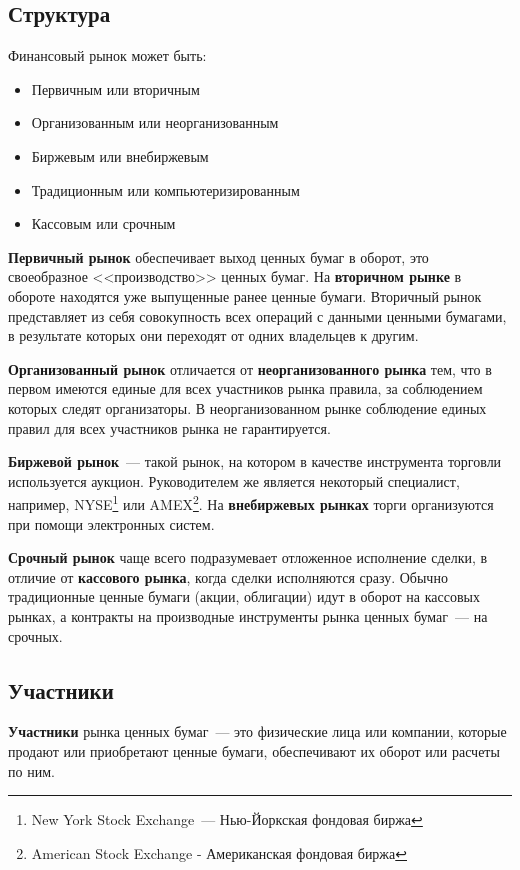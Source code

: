 \documentclass[14pt]{matmex-diploma-custom}
\begin{document}
\subsection{Структура}

Финансовый рынок может быть:

\begin{itemize}
\item Первичным или вторичным
\item Организованным или неорганизованным
\item Биржевым или внебиржевым
\item Традиционным или компьютеризированным
\item Кассовым или срочным
\end{itemize}

\textbf{Первичный рынок} обеспечивает выход ценных бумаг в оборот, это своеобразное <<производство>> ценных бумаг. На \textbf{вторичном рынке} в обороте находятся уже выпущенные ранее ценные бумаги. Вторичный рынок представляет из себя совокупность всех операций с данными ценными бумагами, в результате которых они переходят от одних владельцев к другим.

\textbf{Организованный рынок} отличается от \textbf{неорганизованного рынка} тем, что в первом имеются единые для всех участников рынка правила, за соблюдением которых следят организаторы. В неорганизованном рынке соблюдение единых правил для всех участников рынка не гарантируется.

\textbf{Биржевой рынок}~--- такой рынок, на котором в качестве инструмента торговли используется аукцион. Руководителем же является некоторый специалист, например, NYSE\footnote{New York Stock Exchange~--- Нью-Йоркская фондовая биржа} или AMEX\footnote{American Stock Exchange - Американская фондовая биржа}. На \textbf{внебиржевых рынках} торги организуются при помощи электронных систем.

\textbf{Срочный рынок} чаще всего подразумевает отложенное исполнение сделки, в отличие от \textbf{кассового рынка}, когда сделки исполняются сразу. Обычно традиционные ценные бумаги (акции, облигации) идут в оборот на кассовых рынках, а контракты на производные инструменты рынка ценных бумаг~--- на срочных.

\subsection{Участники}

\textbf{Участники} рынка ценных бумаг~--- это физические лица или компании, которые продают или приобретают ценные бумаги, обеспечивают их оборот или расчеты по ним. 
\end{document}
